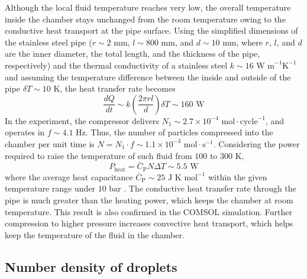 Although the local fluid temperature reaches very low, the overall temperature inside the chamber stays unchanged from the room temperature owing to the conductive heat transport at the pipe surface. Using the simplified dimensions of the stainless steel pipe ($r∼2 \text{ mm}$, $l∼800 \text{ mm}$, and $d∼10 \text{ mm}$, where $r$, $l$, and $d$ are the inner diameter, the total length, and the thickness of the pipe, respectively) and the thermal conductivity of a stainless steel $k \sim 16 \text{ W m}^{-1}\text{K}^{-1}$ and assuming the temperature difference between the inside and outside of the pipe $\delta T \sim 10 \text{ K}$, the heat transfer rate becomes
\begin{equation}
\frac{d Q}{d t} \sim k \left( \frac{2 \pi r l}{d} \right) \delta T \sim 160 \text{ W}
\end{equation}
In the experiment, the compressor delivers $N_1 \sim 2.7 \times 10^{-4} \text{ mol} \cdot \text{cycle}^{-1}$, and operates in $f \sim 4.1 \text{ Hz}$. Thus, the number of particles compressed into the chamber per unit time is $N = N_1 \cdot f \sim 1.1 \times 10^{-3} \text{ mol} \cdot \text{s}^{-1}$. Considering the power required to raise the temperature of such fluid from $100$ to $300 \text{ K}$,
\begin{equation}
P_{\text {heat}}=\bar{C}_{\text{P}} N \Delta T \sim 5.5 \text{ W}
\end{equation}
where the average heat capacitance $\bar{C}_{\text{P}} \sim 25 \text{ J K mol}^{-1}$ within the given temperature range under $10 \text{ bar}$ \cite{linstorm2020nist}. The conductive heat transfer rate through the pipe is much greater than the heating power, which keeps the chamber at room temperature. This result is also confirmed in the COMSOL simulation. Further compression to higher pressure increases convective heat transport, which helps keep the temperature of the fluid in the chamber.

\subsection{Number density of droplets}
\label{sec:ch2-3-2}

